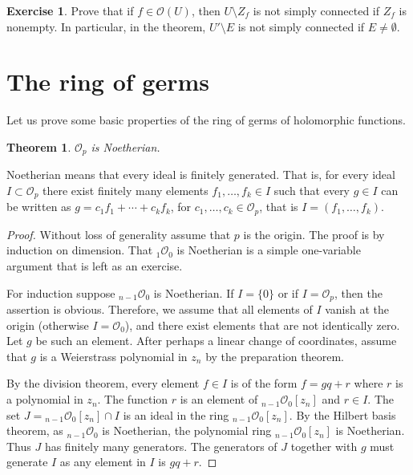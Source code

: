 \documentclass[12pt,openany]{book}
\newcommand{\sO}{{\mathcal{O}}}
\newcommand{\sectionnewpage}{}
\theoremstyle{plain}
\newtheorem{thm}{Theorem}[section]
\theoremstyle{remark}
\theoremstyle{definition}
\newenvironment{exbox}{%
    \def\FrameCommand{\vrule width 1pt \relax\hspace {10pt}}%
    \MakeFramed {\advance \hsize -\width \FrameRestore }%
}{%
    \endMakeFramed
}
\theoremstyle{exercise}
\newtheorem{exercise}{Exercise}[section]
\theoremstyle{example}
\begin{document}
\begin{exbox}
\begin{exercise}
Prove that if $f \in \sO(U)$, then $U \setminus Z_f$ is not simply
connected if $Z_f$ is nonempty.  In particular, in the theorem, $U' \setminus E$ is not
simply connected if $E \not= \emptyset$.
\end{exercise}
\end{exbox}


\sectionnewpage
\section{The ring of germs} \label{sec:ring of germs}

Let us prove some basic properties of the
ring of germs of holomorphic functions.

\begin{thm}
$\sO_p$ is Noetherian.
\end{thm}

Noetherian means that every ideal is finitely generated.
That is, for every ideal $I \subset \sO_p$
there exist finitely many elements $f_1,\ldots,f_k \in I$ such that
every $g \in I$ can be written as $g = c_1 f_1 + \cdots + c_k f_k$,
for $c_1,\ldots,c_k \in \sO_p$,
that is $I = (f_1,\ldots,f_k)$.

\begin{proof}
Without loss of generality assume that $p$ is the origin.  The proof is by
induction on dimension.  That ${}_1\sO_0$ is Noetherian is a simple
one-variable argument that is left as an exercise.

For induction suppose ${}_{n-1}\sO_0$ is Noetherian.  If $I = \{ 0 \}$
or if $I = \sO_p$, then the assertion is obvious.  Therefore, we assume
that all elements of $I$ vanish at the origin (otherwise $I = \sO_0$), and
there exist elements that are not identically zero.  Let $g$
be such an element.  After perhaps a linear change of coordinates, 
assume that $g$ is a Weierstrass polynomial in $z_n$
by the preparation theorem.

By the division theorem,
every element $f \in I$ is of the form $f = gq+r$ where $r$
is a polynomial in $z_n$.  The function 
$r$ is an element of ${}_{n-1}\sO_0[z_n]$ and $r \in I$.
The set $J= {}_{n-1}\sO_0[z_n] \cap I$ is an ideal in the
ring ${}_{n-1}\sO_0[z_n]$.  By the Hilbert basis theorem, as
${}_{n-1}\sO_0$ is Noetherian, the polynomial ring
${}_{n-1}\sO_0[z_n]$ is Noetherian.  Thus $J$ has finitely many generators.
The generators of $J$ together with $g$ must generate $I$ as any
element in $I$ is $gq+r$.
\end{proof}
\end{document}
